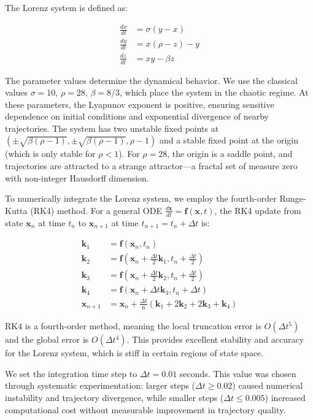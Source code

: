 ﻿\documentclass[12pt,a4paper,oneside]{report}
\begin{document}
The Lorenz system is defined as:

\begin{align}
\frac{dx}{dt} &= \sigma(y - x) \\
\frac{dy}{dt} &= x(\rho - z) - y \\
\frac{dz}{dt} &= xy - \beta z
\end{align}

The parameter values determine the dynamical behavior. We use the classical values $\sigma = 10$, $\rho = 28$, $\beta = 8/3$, which place the system in the chaotic regime. At these parameters, the Lyapunov exponent is positive, ensuring sensitive dependence on initial conditions and exponential divergence of nearby trajectories. The system has two unstable fixed points at $(\pm\sqrt{\beta(\rho-1)}, \pm\sqrt{\beta(\rho-1)}, \rho-1)$ and a stable fixed point at the origin (which is only stable for $\rho < 1$). For $\rho = 28$, the origin is a saddle point, and trajectories are attracted to a strange attractor---a fractal set of measure zero with non-integer Hausdorff dimension.

To numerically integrate the Lorenz system, we employ the fourth-order Runge-Kutta (RK4) method. For a general ODE $\frac{d\mathbf{x}}{dt} = \mathbf{f}(\mathbf{x}, t)$, the RK4 update from state $\mathbf{x}_n$ at time $t_n$ to $\mathbf{x}_{n+1}$ at time $t_{n+1} = t_n + \Delta t$ is:

\begin{align}
\mathbf{k}_1 &= \mathbf{f}(\mathbf{x}_n, t_n) \\
\mathbf{k}_2 &= \mathbf{f}(\mathbf{x}_n + \frac{\Delta t}{2}\mathbf{k}_1, t_n + \frac{\Delta t}{2}) \\
\mathbf{k}_3 &= \mathbf{f}(\mathbf{x}_n + \frac{\Delta t}{2}\mathbf{k}_2, t_n + \frac{\Delta t}{2}) \\
\mathbf{k}_4 &= \mathbf{f}(\mathbf{x}_n + \Delta t \mathbf{k}_3, t_n + \Delta t) \\
\mathbf{x}_{n+1} &= \mathbf{x}_n + \frac{\Delta t}{6}(\mathbf{k}_1 + 2\mathbf{k}_2 + 2\mathbf{k}_3 + \mathbf{k}_4)
\end{align}

RK4 is a fourth-order method, meaning the local truncation error is $O(\Delta t^5)$ and the global error is $O(\Delta t^4)$. This provides excellent stability and accuracy for the Lorenz system, which is stiff in certain regions of state space.

We set the integration time step to $\Delta t = 0.01$ seconds. This value was chosen through systematic experimentation: larger steps ($\Delta t \geq 0.02$) caused numerical instability and trajectory divergence, while smaller steps ($\Delta t \leq 0.005$) increased computational cost without measurable improvement in trajectory quality.
\end{document}
